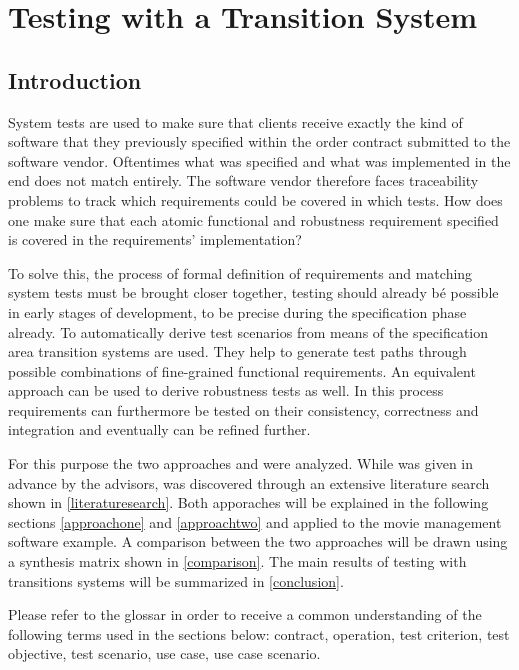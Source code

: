 \chapter{Testing with a Transition System}


\section{Introduction}

System tests are used to make sure that clients receive exactly the kind of software that they previously specified within the order contract submitted to the software vendor. Oftentimes what was specified and what was implemented in the end does not match entirely. The software vendor therefore faces traceability problems to track which requirements could be covered in which tests. How does one make sure that each atomic functional and robustness requirement specified is covered in the requirements' implementation?

To solve this, the process of formal definition of requirements and matching system tests must be brought closer together, testing should already bé possible in early stages of development, to be precise during the specification phase already. To automatically derive test scenarios from means of the specification area transition systems are used. They help to generate test paths through possible combinations of fine-grained functional requirements. An equivalent approach can be used to derive robustness tests as well. In this process requirements can furthermore be tested on their consistency, correctness and integration and eventually can be refined further.

For this purpose the two approaches \cite{ClementineNebut2006} and \cite{NajlaRaza2007} were analyzed. While \cite{ClementineNebut2006} was given in advance by the advisors, \cite{NajlaRaza2007} was discovered through an extensive literature search shown in \autoref{literaturesearch}. Both apporaches will be explained in the following sections \ref{approachone} and \ref{approachtwo} and applied to the movie management software example. A comparison between the two approaches will be drawn using a synthesis matrix shown in \autoref{comparison}. The main results of testing with transitions systems will be summarized in \autoref{conclusion}. 

Please refer to the glossar in order to receive a common understanding of the following terms used in the sections below: contract, operation, test criterion, test objective, test scenario, use case, use case scenario.

